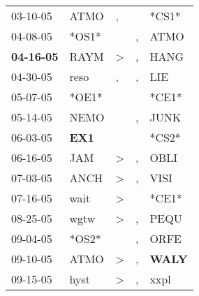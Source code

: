 \begin{supertabular}{p{0.07\textwidth}p{0.06\textwidth}p{0.02\textwidth}p{0.02\textwidth}p{0.06\textwidth}}
          03-10-05\textsuperscript{} &           ATMO\textsuperscript{} &                , &                  &                            *CS1* \\
          04-08-05\textsuperscript{} &                            *OS1* &                  &                , &           ATMO\textsuperscript{} \\
 \textbf{04-16-05\textsuperscript{}} &           RAYM\textsuperscript{} &     \textgreater &                , &           HANG\textsuperscript{} \\
          04-30-05\textsuperscript{} &           reso\textsuperscript{} &                , &                , &            LIE\textsuperscript{} \\
          05-07-05\textsuperscript{} &                            *OE1* &                  &                  &                            *CE1* \\
          05-14-05\textsuperscript{} &           NEMO\textsuperscript{} &                  &                , &           JUNK\textsuperscript{} \\
          06-03-05\textsuperscript{} &   \textbf{EX1\textsuperscript{}} &                  &                  &                            *CS2* \\
          06-16-05\textsuperscript{} &            JAM\textsuperscript{} &     \textgreater &                , &           OBLI\textsuperscript{} \\
          07-03-05\textsuperscript{} &           ANCH\textsuperscript{} &     \textgreater &                , &           VISI\textsuperscript{} \\
          07-16-05\textsuperscript{} &           wait\textsuperscript{} &     \textgreater &                  &                            *CE1* \\
          08-25-05\textsuperscript{} &           wgtw\textsuperscript{} &     \textgreater &                , &           PEQU\textsuperscript{} \\
          09-04-05\textsuperscript{} &                            *OS2* &                  &                , &           ORFE\textsuperscript{} \\
          09-10-05\textsuperscript{} &           ATMO\textsuperscript{} &     \textgreater &                , &  \textbf{WALY\textsuperscript{}} \\
          09-15-05\textsuperscript{} &           hyst\textsuperscript{} &     \textgreater &                , &           xxpl\textsuperscript{} \\

\end{supertabular}
